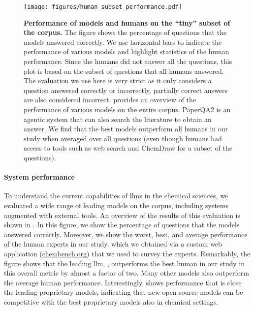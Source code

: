 \documentclass[11pt, oneside]{article}
\begin{document}
\begin{refsection}
\begin{figure}[!h]
    \centering
    \texttt{[image: figures/human\_subset\_performance.pdf]}
    \caption{\textbf{Performance of models and humans on the \enquote{tiny} subset of the  \chembench corpus.} The figure shows the percentage of questions that the models answered correctly. We use horizontal bars to indicate the performance of various models and highlight statistics of the human performance. 
    Since the humans did not answer all the questions, this plot is based on the subset of questions that all humans answered.
    The evaluation we use here is very strict as it only considers a question answered correctly or incorrectly, partially correct answers are also considered incorrect.
     provides an overview of the performance of various models on the entire corpus.
    PaperQA2\autocite{skarlinski2024language} is an agentic system that can also search the literature to obtain an answer. We find that the best models outperform all humans in our study when averaged over all questions (even though humans had access to tools such as web search and ChemDraw for a subset of the questions). 
    }
    \label{fig:human_vs_models_bar}
\end{figure}

\paragraph{System performance} 
To understand the current capabilities of \glspl{llm} in the chemical sciences, we evaluated a wide range of leading models\autocite{Huggingface} on the \chembench corpus, including systems augmented with external tools.
An overview of the results of this evaluation is shown in . 
In this figure, we show the percentage of questions that the models answered correctly.
Moreover, we show the worst, best, and average performance of the human experts in our study, which we obtained via a custom web application (\url{chembench.org}) that we used to survey the experts.
Remarkably, the figure shows that the leading \gls{llm}, \oone, outperforms the best human in our study in this overall metric by almost a factor of two.
Many other models also outperform the average human performance. 
Interestingly, \LlamaThreeOneFourZeroFiveBInstruct shows performance that is close the leading proprietary models, indicating that new open source models can be competitive with the best proprietary models also in chemical settings.


\end{refsection}
\end{document}
